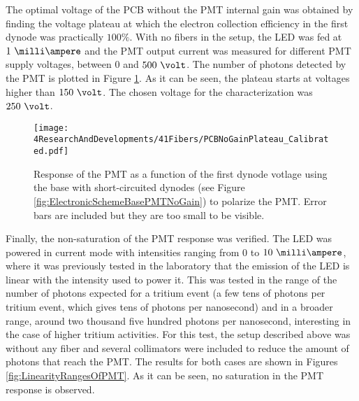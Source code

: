 

The optimal voltage of the PCB without the PMT internal gain was obtained by finding the voltage plateau at which the electron collection efficiency in the first dynode was practically $100\%$. With no fibers in the setup, the LED was fed at $1~\milli\ampere$ and the PMT output current was measured for different PMT supply voltages, between $0$ and $500~\volt$. The number of photons detected by the PMT is plotted in Figure \ref{fig:PlateauNoGainPMT}. As it can be seen, the plateau starts at voltages higher than $150~\volt$. The chosen voltage for the characterization was $250~\volt$.

\begin{figure}[h]
\centering
\texttt{[image: 4ResearchAndDevelopments/41Fibers/PCBNoGainPlateau\_Calibrated.pdf]}
\caption{Response of the PMT as a function of the first dynode votlage using the base with short-circuited dynodes (see Figure \ref{fig:ElectronicSchemeBasePMTNoGain}) to polarize the PMT. Error bars are included but they are too small to be visible.\label{fig:PlateauNoGainPMT}}
\end{figure}

Finally, the non-saturation of the PMT response was verified. The LED was powered in current mode with intensities ranging from 0 to $10~\milli\ampere$, where it was previously tested in the laboratory that the emission of the LED is linear with the intensity used to power it. This was tested in the range of the number of photons expected for a tritium event (a few tens of photons per tritium event, which gives tens of photons per nanosecond) and in a broader range, around two thousand five hundred photons per nanosecond, interesting in the case of higher tritium activities. For this test, the setup described above was without any fiber and several collimators were included to reduce the amount of photons that reach the PMT. The results for both cases are shown in Figures \ref{fig:LinearityRangesOfPMT}. As it can be seen, no saturation in the PMT response is observed.


